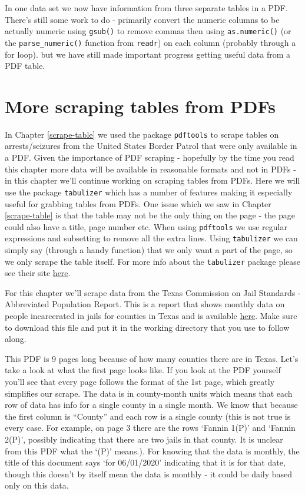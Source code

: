 \documentclass[
  12pt,
]{book}
\begin{document}
In one data set we now have information from three separate tables in a PDF. There's still some work to do - primarily convert the numeric columns to be actually numeric using \texttt{gsub()} to remove commas then using \texttt{as.numeric()} (or the \texttt{parse\_numeric()} function from \texttt{readr}) on each column (probably through a for loop). but we have still made important progress getting useful data from a PDF table.

\hypertarget{scrape-table2}{%
\chapter{More scraping tables from PDFs}\label{scrape-table2}}

In Chapter \ref{scrape-table} we used the package \texttt{pdftools} to scrape tables on arrests/seizures from the United States Border Patrol that were only available in a PDF. Given the importance of PDF scraping - hopefully by the time you read this chapter more data will be available in reasonable formats and not in PDFs - in this chapter we'll continue working on scraping tables from PDFs. Here we will use the package \texttt{tabulizer} which has a number of features making it especially useful for grabbing tables from PDFs. One issue which we saw in Chapter \ref{scrape-table} is that the table may not be the only thing on the page - the page could also have a title, page number etc. When using \texttt{pdftools} we use regular expressions and subsetting to remove all the extra lines. Using \texttt{tabulizer} we can simply say (through a handy function) that we only want a part of the page, so we only scrape the table itself. For more info about the \texttt{tabulizer} package please see their site \href{https://docs.ropensci.org/tabulizer/}{here}.

For this chapter we'll scrape data from the Texas Commission on Jail Standards - Abbreviated Population Report. This is a report that shows monthly data on people incarcerated in jails for counties in Texas and is available \href{https://github.com/jacobkap/crimebythenumbers/blob/master/data/AbbreRptCurrent.pdf}{here}. Make sure to download this file and put it in the working directory that you use to follow along.

This PDF is 9 pages long because of how many counties there are in Texas. Let's take a look at what the first page looks like. If you look at the PDF yourself you'll see that every page follows the format of the 1st page, which greatly simplifies our scrape. The data is in county-month units which means that each row of data has info for a single county in a single month. We know that because the first column is ``County'' and each row is a single county (this is not true is every case. For example, on page 3 there are the rows `Fannin 1(P)' and `Fannin 2(P)', possibly indicating that there are two jails in that county. It is unclear from this PDF what the `(P)' means.). For knowing that the data is monthly, the title of this document says `for 06/01/2020' indicating that it is for that date, though this doesn't by itself mean the data is monthly - it could be daily based only on this data.
\end{document}
